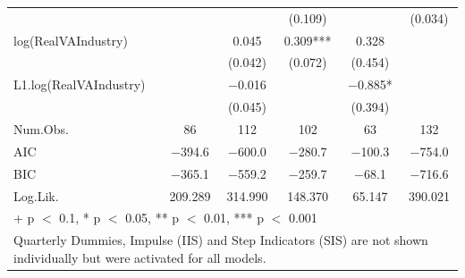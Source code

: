 \begin{table}
{\begin{tabular}[t]{lccccc}
 &  &  & (\num{0.109}) &  & (\num{0.034})\\
log(RealVAIndustry) &  & \num{0.045} & \num{0.309}*** & \num{0.328} & \\
 &  & (\num{0.042}) & (\num{0.072}) & (\num{0.454}) & \\
L1.log(RealVAIndustry) &  & \num{-0.016} &  & \num{-0.885}* & \\
 &  & (\num{0.045}) &  & (\num{0.394}) & \\
\midrule
Num.Obs. & \num{86} & \num{112} & \num{102} & \num{63} & \num{132}\\
AIC & \num{-394.6} & \num{-600.0} & \num{-280.7} & \num{-100.3} & \num{-754.0}\\
BIC & \num{-365.1} & \num{-559.2} & \num{-259.7} & \num{-68.1} & \num{-716.6}\\
Log.Lik. & \num{209.289} & \num{314.990} & \num{148.370} & \num{65.147} & \num{390.021}\\
\bottomrule
\multicolumn{6}{l}{\rule{0pt}{1em}+ p $<$ 0.1, * p $<$ 0.05, ** p $<$ 0.01, *** p $<$ 0.001}\\
\multicolumn{6}{l}{\rule{0pt}{1em}Quarterly Dummies, Impulse (IIS) and Step Indicators (SIS) are not shown individually but were activated for all models.}\\
\end{tabular}}
\end{table}
